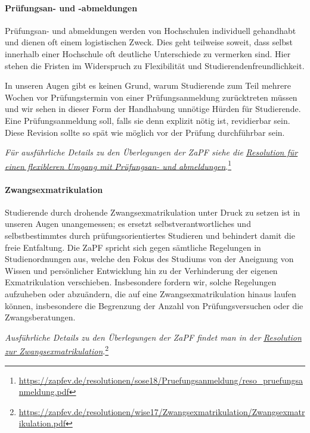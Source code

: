\documentclass[DIV=calc]{scrartcl}
\begin{document}
\hypertarget{pruxfcfungsan--und--abmeldungen}{%
\paragraph{Prüfungsan- und -abmeldungen}\label{pruxfcfungsan--und--abmeldungen}}

Prüfungsan- und abmeldungen werden von Hochschulen individuell
gehandhabt und dienen oft einem logistischen Zweck. Dies geht teilweise soweit, dass selbst innerhalb einer Hochschule oft deutliche Unterschiede zu vermerken sind. Hier stehen die Fristen im Widerspruch zu Flexibilität und Studierendenfreundlichkeit.

In unseren Augen gibt es keinen Grund, warum Studierende zum Teil
mehrere Wochen vor Prüfungstermin von einer Prüfungsanmeldung
zurücktreten müssen und wir sehen in dieser Form der Handhabung unnötige Hürden für Studierende. Eine Prüfungsanmeldung soll, falls sie denn explizit nötig ist, revidierbar sein. Diese Revision sollte so spät wie möglich vor der Prüfung durchführbar sein.

\emph{Für ausführliche Details zu den Überlegungen der ZaPF siehe die}
\href{https://zapfev.de/resolutionen/sose18/Pruefungsanmeldung/reso_pruefungsanmeldung.pdf}{\emph{Resolution
    für einen flexibleren Umgang mit Prüfungsan- und abmeldungen}}.\footnote{\url{https://zapfev.de/resolutionen/sose18/Pruefungsanmeldung/reso_pruefungsanmeldung.pdf}}

\hypertarget{zwangsexmatrikulation}{%
\paragraph{Zwangsexmatrikulation}\label{zwangsexmatrikulation}}

Studierende durch drohende Zwangsexmatrikulation unter Druck zu setzen ist in unseren Augen unangemessen; es ersetzt selbstverantwortliches und selbstbestimmtes durch prüfungsorientiertes Studieren und behindert damit die freie Entfaltung. Die ZaPF spricht sich gegen sämtliche Regelungen in Studienordnungen aus, welche den Fokus des Studiums von der Aneignung von Wissen und persönlicher Entwicklung hin zu der
Verhinderung der eigenen Exmatrikulation verschieben. Insbesondere fordern wir, solche Regelungen aufzuheben oder abzuändern, die auf eine Zwangsexmatrikulation hinaus laufen können, insbesondere die Begrenzung der Anzahl von Prüfungsversuchen oder die Zwangsberatungen.

\emph{Ausführliche Details zu den Überlegungen der ZaPF findet man in der} \href{https://zapfev.de/resolutionen/wise17/Zwangsexmatrikulation/Zwangsexmatrikulation.pdf}{\emph{Resolution
zur Zwangsexmatrikulation}}.\footnote{\url{https://zapfev.de/resolutionen/wise17/Zwangsexmatrikulation/Zwangsexmatrikulation.pdf}}
\end{document}
